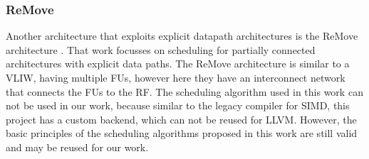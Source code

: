 \subsubsection{ReMove}

Another architecture that exploits explicit datapath architectures is the ReMove architecture \cite{remove}. That work focusses on scheduling for partially connected architectures with explicit data paths. The ReMove architecture is similar to a VLIW, having multiple FUs, however here they have an interconnect network that connects the FUs to the RF. The scheduling algorithm used in this work can not be used in our work, because similar to the legacy compiler for SIMD, this project has a custom backend, which can not be reused for LLVM. However, the basic principles of the scheduling algorithms proposed in this work are still valid and may be reused for our work.




